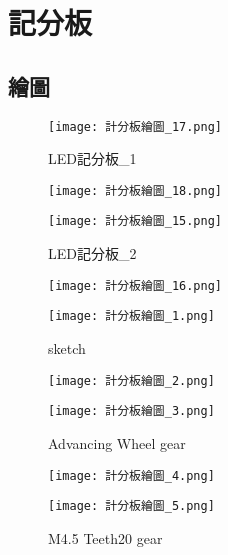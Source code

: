 \chapter{記分板}
\section{繪圖}
\begin{figure}[hbt!]
  \centering
  \texttt{[image: 計分板繪圖\_17.png]}
  \caption{LED記分板\_1}
  \label{fig:photo1}
\end{figure}

\begin{figure}[hbt!]
  \centering
  \texttt{[image: 計分板繪圖\_18.png]}
\end{figure}

\begin{figure}[hbt!]
  \centering
  \texttt{[image: 計分板繪圖\_15.png]}
  \caption{LED記分板\_2}
  \label{fig:photo2}
\end{figure}

\begin{figure}[hbt!]
  \centering
  \texttt{[image: 計分板繪圖\_16.png]}
\end{figure}

\begin{figure}[hbt!]
  \centering
  \texttt{[image: 計分板繪圖\_1.png]}
  \caption{sketch}
  \label{fig:photo3}
\end{figure}

\begin{figure}[hbt!]
  \centering
  \texttt{[image: 計分板繪圖\_2.png]}
\end{figure}

\begin{figure}[hbt!]
  \centering
  \texttt{[image: 計分板繪圖\_3.png]}
  \caption{Advancing Wheel gear}
  \label{fig:photo4}
\end{figure}

\begin{figure}[hbt!]
  \centering
  \texttt{[image: 計分板繪圖\_4.png]}
\end{figure}

\begin{figure}[hbt!]
  \centering
  \texttt{[image: 計分板繪圖\_5.png]}
  \caption{M4.5 Teeth20 gear}
  \label{fig:photo5}
\end{figure}

